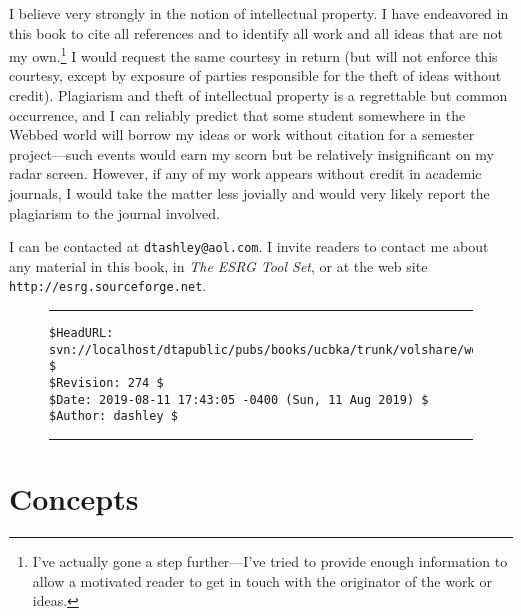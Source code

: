 \documentclass[letterpaper,10pt,titlepage]{custbook}
\begin{document}
I  believe very
strongly in the notion of intellectual property.  I have endeavored
in this book to cite all references and to identify all work and
all ideas that are not my own.\footnote{I've actually gone a step
further---I've tried to provide enough information to allow a
motivated reader to get in touch with the originator of the work
or ideas.}  I would request the same courtesy in return (but will
not enforce this courtesy, except by exposure of parties responsible
for the theft of ideas without credit).  Plagiarism and theft of intellectual property is a 
regrettable but common occurrence, and I can
reliably predict that some student somewhere in the Webbed world
will borrow my ideas or work without citation
for a semester project---such events would earn my scorn 
but be relatively insignificant
on my radar screen.  However, if any of my work appears without
credit in academic journals, I would take the matter less
jovially and would very likely report the plagiarism to the journal 
involved.

I 
can be contacted at \texttt{dtashley@aol.com}.  I invite readers
to contact me about
any material in this book, in \emph{The ESRG Tool Set}, or at
the web site \texttt{http://esrg.sourceforge.net}.


\noindent\begin{figure}[!b]
\noindent\rule[-0.25in]{\textwidth}{1pt}
\begin{tiny}
\begin{verbatim}
$HeadURL: svn://localhost/dtapublic/pubs/books/ucbka/trunk/volshare/workprfa.tex $
$Revision: 274 $
$Date: 2019-08-11 17:43:05 -0400 (Sun, 11 Aug 2019) $
$Author: dashley $
\end{verbatim}
\end{tiny}
\noindent\rule[0.25in]{\textwidth}{1pt}
\end{figure}
%

%

%
\tableofcontents
%
\listoftables
%
\listoffigures
%
\listofalgorithms
%
\mainmatter{}
%

\part{Concepts}
\end{document}

